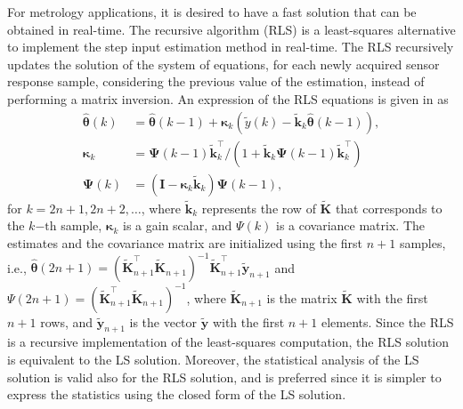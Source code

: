For metrology applications, it is desired to have a fast solution that can be obtained in real-time. 
The recursive algorithm (RLS) is a least-squares alternative to implement the step input estimation method in real-time.
The RLS recursively updates the solution of the system of equations, for each newly acquired sensor response sample, considering the previous value of the estimation, instead of performing a matrix inversion.
An expression of the RLS equations is given in \citet{Kailath00book} as
\begin{equation} \begin{aligned} \widehat{\bm{\theta}}(k) &= \widehat{\bm{\theta}}(k-1) + \bm{\kappa}_{k} \left( \widetilde{y}(k) - \widetilde{\mathbf{k}}_{k} \widehat{\bm{\theta}}(k-1) \right) , \\  \bm{\kappa}_{k} &= \bm{\Psi}(k-1) \widetilde{\mathbf{k}}_{k}^\top / \left( 1 + \widetilde{\mathbf{k}}_{k} \bm{\Psi}(k-1) \widetilde{\mathbf{k}}_{k}^\top  \right) \\ \bm{\Psi}(k) &= \left( \mathbf{I} - \bm{\kappa}_{k} \widetilde{\mathbf{k}}_{k} \right) \bm{\Psi}(k-1), \label{eqn:RLS} \end{aligned} \end{equation}
for $k = 2n+1, 2n+2, \ldots$, where $\widetilde{\mathbf{k}}_{k}$ represents the row of $\widetilde{\mathbf{K}}$ that corresponds to the $k\mathrm{-th}$ sample, $\bm{\kappa}_{k}$ is a gain scalar, and $\Psi(k)$ is a covariance matrix.
The estimates and the covariance matrix are initialized using the first $n+1$ samples, i.e.,  $\widehat{\bm{\theta}} (2n+1) = \left( \widetilde{\mathbf{K}}_{n+1}^\top \widetilde{\mathbf{K}}_{n+1} \right)^{-1} \widetilde{\mathbf{K}}_{n+1}^\top \widetilde{\mathbf{y}}_{n+1}$ and $\Psi(2n+1) = \left( \widetilde{\mathbf{K}}_{n+1}^\top \widetilde{\mathbf{K}}_{n+1} \right)^{-1}$, where $\widetilde{\mathbf{K}}_{n+1}$ is the matrix $\widetilde{\mathbf{K}}$ with the first $n+1$ rows, and $\widetilde{\mathbf{y}}_{n+1}$ is the vector $\widetilde{\mathbf{y}}$ with the first $n+1$ elements.
Since the RLS is a recursive implementation of the least-squares computation, the RLS solution is equivalent to the LS solution.
Moreover, the statistical analysis of the LS solution is valid also for the RLS solution, and is preferred since it is simpler to express the statistics using the closed form of the LS solution. 

